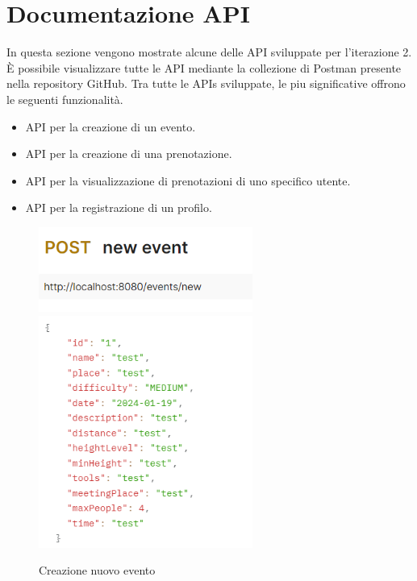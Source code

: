 \section{Documentazione API}
In questa sezione vengono mostrate alcune delle API sviluppate per l’iterazione 2. 
È possibile visualizzare tutte le API mediante la collezione di Postman presente nella repository GitHub.
Tra tutte le APIs sviluppate, le piu significative offrono le seguenti funzionalità.
\begin{itemize}
    \item API per la creazione di un evento.
    \item API per la creazione di una prenotazione.
    \item API per la visualizzazione di prenotazioni di uno specifico utente.
    \item API per la registrazione di un profilo.
\end{itemize}


\newpage

\begin{figure}[h!]
\includegraphics[width=7cm]{test/postman/tnewevent.PNG}\\
\includegraphics[width=7cm]{test/postman/newevent.PNG}\\
\caption{Creazione nuovo evento}
\end{figure}

